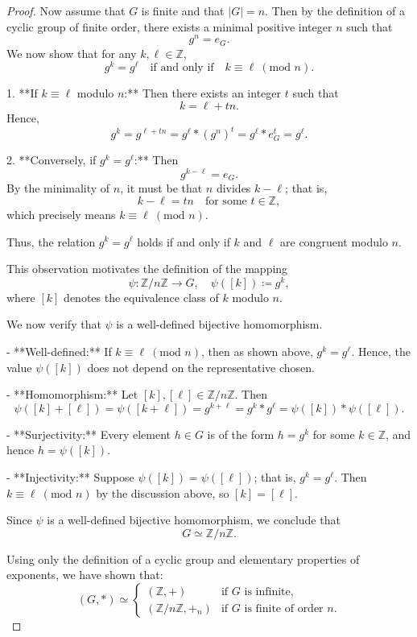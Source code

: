 \documentclass[11pt,openany]{article}
\begin{document}
\begin{proof}
	Now assume that \(G\) is finite and that \(|G|=n\). Then by the definition of a cyclic group of finite order, there exists a minimal positive integer \(n\) such that
\[
g^n = e_G.
\]
We now show that for any \(k,\ell\in \mathbb{Z}\),
\[
g^k = g^\ell \quad \text{if and only if} \quad k\equiv \ell \ (\text{mod } n).
\]

1. **If \(k\equiv \ell\) modulo \(n\):**  
Then there exists an integer \(t\) such that
\[
k = \ell + tn.
\]
Hence,
\[
g^k = g^{\ell + tn} = g^\ell \ast (g^n)^t = g^\ell \ast e_G^t = g^\ell.
\]

2. **Conversely, if \(g^k = g^\ell\):**  
Then
\[
g^{k-\ell}=e_G.
\]
By the minimality of \(n\), it must be that \(n\) divides \(k-\ell\); that is,
\[
k-\ell = tn \quad \text{for some } t\in \mathbb{Z},
\]
which precisely means \(k\equiv \ell \ (\text{mod } n)\).

Thus, the relation \(g^k = g^\ell\) holds if and only if \(k\) and \(\ell\) are congruent modulo \(n\).

This observation motivates the definition of the mapping
\[
\psi: \mathbb{Z}/n\mathbb{Z} \to G,\quad \psi([k]) \coloneqq g^k,
\]
where \([k]\) denotes the equivalence class of \(k\) modulo \(n\).

We now verify that \(\psi\) is a well-defined bijective homomorphism.

- **Well-defined:**  
If \(k \equiv \ell \ (\text{mod } n)\), then as shown above, \(g^k=g^\ell\). Hence, the value \(\psi([k])\) does not depend on the representative chosen.

- **Homomorphism:**  
Let \([k],[\ell]\in \mathbb{Z}/n\mathbb{Z}\). Then
\[
\psi([k]+[\ell]) = \psi([k+\ell]) = g^{k+\ell} = g^k \ast g^\ell = \psi([k]) \ast \psi([\ell]).
\]

- **Surjectivity:**  
Every element \(h\in G\) is of the form \(h=g^k\) for some \(k\in \mathbb{Z}\), and hence \(h=\psi([k])\).

- **Injectivity:**  
Suppose \(\psi([k])=\psi([\ell])\); that is, \(g^k=g^\ell\). Then \(k\equiv \ell\ (\text{mod } n)\) by the discussion above, so \([k]=[\ell]\).

Since \(\psi\) is a well-defined bijective homomorphism, we conclude that
\[
G \simeq \mathbb{Z}/n\mathbb{Z}.
\]

Using only the definition of a cyclic group and elementary properties of exponents, we have shown that:
\[
(G,\ast) \simeq
\begin{cases}
	(\mathbb{Z},+) & \text{if } G \text{ is infinite,} \\
	(\mathbb{Z}/n\mathbb{Z},+_n) & \text{if } G \text{ is finite of order } n.
\end{cases}
\]


\end{proof}
\end{document}
